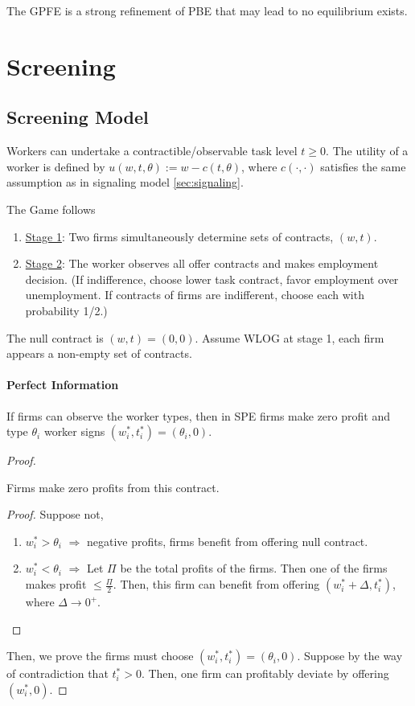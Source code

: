 \documentclass[11pt]{elegantbook_2}
\begin{document}
\begin{note}
    The GPFE is a strong refinement of PBE that may lead to no equilibrium exists.
\end{note}

\chapter{Screening}
\section{Screening Model}
Workers can undertake a contractible/observable task level $t\geq 0$. The utility of a worker is defined by $u(w,t,\theta):=w-c(t,\theta)$, where $c(\cdot,\cdot)$ satisfies the same assumption as in signaling model \ref{sec:signaling}.

The Game follows
\begin{enumerate}[]
    \item \underline{Stage 1}: Two firms simultaneously determine sets of contracts, $(w,t)$.
    \item \underline{Stage 2}: The worker observes all offer contracts and makes employment decision.
    (If indifference, choose lower task contract, favor employment over unemployment. If contracts of firms are indifferent, choose each with probability 1/2.)
\end{enumerate}

The null contract is $(w,t)=(0,0)$. Assume WLOG at stage 1, each firm appears a non-empty set of contracts.

\subsubsection*{Perfect Information}
\begin{proposition}
    If firms can observe the worker types, then in SPE firms make zero profit and type $\theta_i$ worker signs $(w^*_i,t^*_i)=(\theta_i,0)$.
\end{proposition}
\begin{proof}
    \begin{claim}
        Firms make zero profits from this contract.
    \end{claim}
    \begin{proof}
        Suppose not,
    \begin{enumerate}[$\circ$]
        \item $w^*_i>\theta_i$ $\Rightarrow$ negative profits, firms benefit from offering null contract.
        \item $w^*_i<\theta_i$ $\Rightarrow$ Let $\Pi$ be the total profits of the firms. Then one of the firms makes profit $\leq \frac{\Pi}{2}$. Then, this firm can benefit from offering $(w^*_i+\Delta,t^*_i)$, where $\Delta \rightarrow 0^+$.
    \end{enumerate}
    \end{proof}
    Then, we prove the firms must choose $(w^*_i,t^*_i)=(\theta_i,0)$. Suppose by the way of contradiction that $t_i^*>0$. Then, one firm can profitably deviate by offering $(w^*_i,0)$.
\end{proof}
\end{document}

